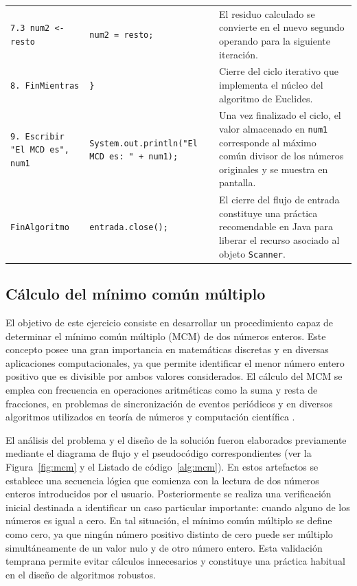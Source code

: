 \documentclass[12pt,twoside]{book}
\begin{document}
\begin{landscape}
\begin{longtable}{p{6cm} p{6cm} p{7.5cm}}
							\texttt{7.3 num2 <- resto}
							&
							\texttt{num2 = resto;}
							&
							El residuo calculado se convierte en el nuevo segundo operando para la siguiente iteración. \\
							
							
							\texttt{8. FinMientras}
							&
							\texttt{\}}
							&
							Cierre del ciclo iterativo que implementa el núcleo del algoritmo de Euclides. \\
							
							\texttt{9. Escribir "El MCD es", num1}
							&
							\texttt{System.out.println("El MCD es: " + num1);}
							&
							Una vez finalizado el ciclo, el valor almacenado en \texttt{num1} corresponde al máximo común divisor de los números originales y se muestra en pantalla. \\
							
							\texttt{FinAlgoritmo}
							&
							\texttt{entrada.close();}
							&
							El cierre del flujo de entrada constituye una práctica recomendable en Java para liberar el recurso asociado al objeto \texttt{Scanner}. \\
							
						\end{longtable}
					\end{landscape}
				
				\subsection{Cálculo del mínimo común múltiplo}
					\noindent
					El objetivo de este ejercicio consiste en desarrollar un procedimiento capaz de determinar el mínimo común múltiplo (MCM) de dos números enteros. Este concepto posee una gran importancia en matemáticas discretas y en diversas aplicaciones computacionales, ya que permite identificar el menor número entero positivo que es divisible por ambos valores considerados. El cálculo del MCM se emplea con frecuencia en operaciones aritméticas como la suma y resta de fracciones, en problemas de sincronización de eventos periódicos y en diversos algoritmos utilizados en teoría de números y computación científica \cite{Futschek2006Algorithmic,Pressman2019Software,Sommerville2015Software}.
					
					El análisis del problema y el diseño de la solución fueron elaborados previamente mediante el diagrama de flujo y el pseudocódigo correspondientes (ver la Figura~\ref{fig:mcm} y el Listado de código~\ref{alg:mcm}). En estos artefactos se establece una secuencia lógica que comienza con la lectura de dos números enteros introducidos por el usuario. Posteriormente se realiza una verificación inicial destinada a identificar un caso particular importante: cuando alguno de los números es igual a cero. En tal situación, el mínimo común múltiplo se define como cero, ya que ningún número positivo distinto de cero puede ser múltiplo simultáneamente de un valor nulo y de otro número entero. Esta validación temprana permite evitar cálculos innecesarios y constituye una práctica habitual en el diseño de algoritmos robustos.
					
\end{document}
